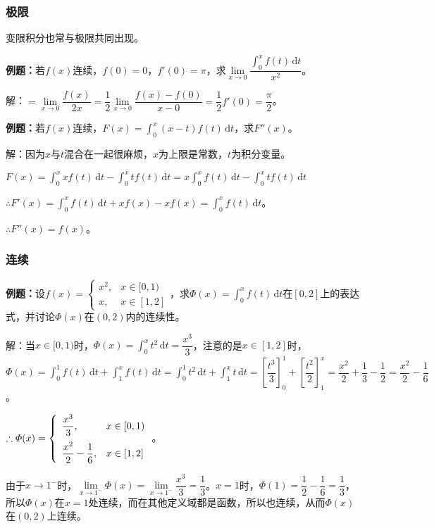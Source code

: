 \documentclass[UTF8, 12pt]{ctexart}
\begin{document}
\subsubsection{极限}

变限积分也常与极限共同出现。

\textbf{例题：}若$f(x)$连续，$f(0)=0$，$f'(0)=\pi$，求$\lim\limits_{x\to0}\dfrac{\int_0^xf(t)\,\textrm{d}t}{x^2}$。

解：$=\lim\limits_{x\to0}\dfrac{f(x)}{2x}=\dfrac{1}{2}\lim\limits_{x\to0}\dfrac{f(x)-f(0)}{x-0}=\dfrac{1}{2}f'(0)=\dfrac{\pi}{2}$。

\textbf{例题：}若$f(x)$连续，$F(x)=\int_0^x(x-t)f(t)\,\textrm{d}t$，求$F''(x)$。

解：因为$x$与$t$混合在一起很麻烦，$x$为上限是常数，$t$为积分变量。

$F(x)=\int_0^xxf(t)\,\textrm{d}t-\int_0^xtf(t)\,\textrm{d}t=x\int_0^xf(t)\,\textrm{d}t-\int_0^xtf(t)\,\textrm{d}t$

$\therefore F'(x)=\int_0^xf(t)\,\textrm{d}t+xf(x)-xf(x)=\int_0^xf(t)\,\textrm{d}t$。

$\therefore F''(x)=f(x)$。

\subsubsection{连续}

\textbf{例题：}设$f(x)=\left\{\begin{array}{ll}
    x^2, & x\in[0,1) \\
    x, & x\in[1,2]
\end{array}\right.$，求$\varPhi(x)=\int_0^xf(t)\,\textrm{d}t$在$[0,2]$上的表达式，并讨论$\varPhi(x)$在$(0,2)$内的连续性。

解：当$x\in[0,1)$时，$\varPhi(x)=\int_0^xt^2\,\textrm{d}t=\dfrac{x^3}{3}$，注意的是$x\in[1,2]$时，$\varPhi(x)=\int_0^1f(t)\,\textrm{d}t+\int_1^xf(t)\,\textrm{d}t=\int_0^1t^2\,\textrm{d}t+\int_1^xt\,\textrm{d}t=\left[\dfrac{t^3}{3}\right]_0^1+\left[\dfrac{t^2}{2}\right]_1^x=\dfrac{x^2}{2}+\dfrac{1}{3}-\dfrac{1}{2}=\dfrac{x^2}{2}-\dfrac{1}{6}$。

$\therefore\varPhi(x)=\left\{\begin{array}{ll}
    \dfrac{x^3}{3}, & x\in[0,1) \medskip \\
    \dfrac{x^2}{2}-\dfrac{1}{6}, & x\in[1,2]
\end{array}\right.$。

由于$x\to1^-$时，$\lim\limits_{x\to1^-}\varPhi(x)=\lim\limits_{x\to1^-}\dfrac{x^3}{3}=\dfrac{1}{3}$。$x=1$时，$\varPhi(1)=\dfrac{1}{2}-\dfrac{1}{6}=\dfrac{1}{3}$，所以$\varPhi(x)$在$x=1$处连续，而在其他定义域都是函数，所以也连续，从而$\varPhi(x)$在$(0,2)$上连续。
\end{document}
